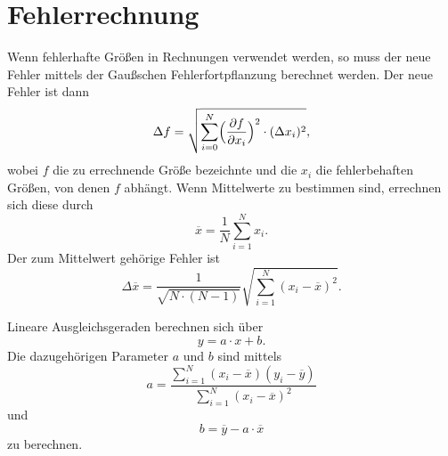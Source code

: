 \section{Fehlerrechnung}
\label{sec:Fehlerrechnung}
Wenn fehlerhafte Größen in Rechnungen verwendet werden, so muss der neue Fehler mittels der Gaußschen Fehlerfortpflanzung berechnet werden. Der neue Fehler ist dann
\begin{equation}
\label{eqn:fehlerfortpflanzung}
\Delta f = \sqrt{\sum_{i=0}^N \Bigl( \frac{\partial f}{\partial x_i} \Bigr) ^2 \cdot (\Delta x_i)^2 },
\end{equation}
wobei $f$ die zu errechnende Größe bezeichnte und die $x_i$ die fehlerbehaften Größen, von denen $f$ abhängt.
Wenn Mittelwerte zu bestimmen sind, errechnen sich diese durch
\begin{equation}
\label{eqn:mittelwert}
\overline{x} = \frac {1} {N} \sum_{i=1}^N x_i.
\end{equation}
Der zum Mittelwert gehörige Fehler ist
\begin{equation}
\label{eqn:FehlerMittelwert}
\Delta \overline{x} = \frac{1}{\sqrt{N \cdot (N-1)}} \sqrt{ \sum_{i=1}^N (x_i - \overline{x})^2}.
\end{equation}

Lineare Ausgleichsgeraden berechnen sich über
\begin{equation}
\label{eqn:Gerade}
y = a \cdot x + b.
\end{equation}
Die dazugehörigen Parameter $a$ und $b$ sind mittels
\begin{equation}
\label{eqn:a}
a = \frac {\sum_{i=1}^N (x_i - \overline{x}) (y_i - \overline{y})}{\sum_{i=1}^N (x_i - \overline{x})^2}
\end{equation}
und
\begin{equation}
\label{eqn:b}
b = \overline{y} - a \cdot \overline{x}
\end{equation}
zu berechnen.